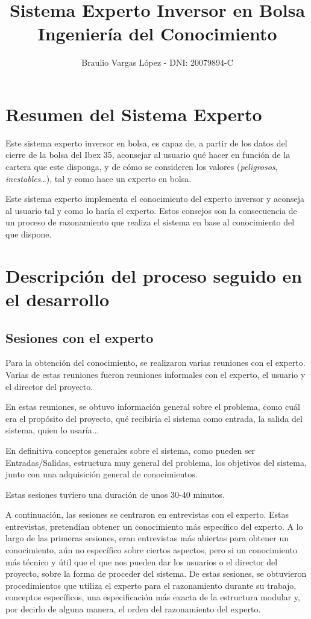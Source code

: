 \documentclass[10pt,spanish]{article}
\title{{\Huge Sistema Experto Inversor en Bolsa}\\{\Large Ingeniería del Conocimiento}}
\author{Braulio Vargas López - DNI: 20079894-C}
\theoremstyle{plain}
\theoremstyle{definition}
\begin{document}
\maketitle
\tableofcontents

\section{Resumen del Sistema Experto}

Este sistema experto inversor en bolsa, es capaz de, a partir de los datos del cierre de la bolsa del Ibex 35, aconsejar al usuario qué hacer en función de la cartera que este disponga, y de cómo se consideren los valores (\textit{peligrosos}, \textit{inestables}\ldots), tal y como hace un experto en bolsa.

Este sistema experto implementa el conocimiento del experto inversor y aconseja al usuario tal y como lo haría el experto. Estos consejos son la consecuencia de un proceso de razonamiento que realiza el sistema en base al conocimiento del que dispone.

\section{Descripción del proceso seguido en el desarrollo}

\subsection{Sesiones con el experto}

Para la obtención del conocimiento, se realizaron varias reuniones con el experto. Varias de estas reuniones fueron reuniones informales con el experto, el usuario y el director del proyecto.

En estas reuniones, se obtuvo información general sobre el problema, como cuál era el propósito del proyecto, qué recibiría el sistema como entrada, la salida del sistema, quien lo usaría... 

En definitiva conceptos generales sobre el sistema, como pueden ser Entradas/Salidas, estructura muy general del problema, los objetivos del sistema, junto con una adquisición general de conocimientos.

Estas sesiones tuviero una duración de unos 30-40 minutos.

A continuación, las sesiones se centraron en entrevistas con el experto. Estas entrevistas, pretendían obtener un conocimiento más específico del experto. A lo largo de las primeras sesiones, eran entrevistas más abiertas para obtener un conocimiento, aún no específico sobre ciertos aspectos, pero si un conocimiento más técnico y útil que el que nos pueden dar los usuarios o el director del proyecto, sobre la forma de proceder del sistema. De estas sesiones, se obtuvieron procedimientos que utiliza el experto para el razonamiento durante su trabajo, conceptos específicos, una especificación más exacta de la estructura modular y, por decirlo de alguna manera, el orden del razonamiento del experto. 
\end{document}
